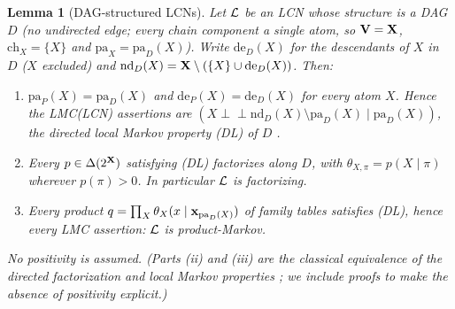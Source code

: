 \documentclass{article} %
\newtheorem{lemma}{Lemma}
\newcommand{\indep}{\perp\!\!\!\perp}
\newcommand{\ch}{\mathrm{ch}}
\newcommand{\pa}{\mathrm{pa}}
\begin{document}
\begin{lemma}[DAG-structured LCNs]\label{lem:dag}
Let $\mathcal{L}$ be an LCN whose structure is a DAG $D$ (no undirected edge; every chain
component a single atom, so $\mathbf{V}=\mathbf{X}$, $\ch_X=\{X\}$ and $\pa_X=\pa_D(X)$). Write
$\mathrm{de}_D(X)$ for the descendants of $X$ in $D$ ($X$ excluded) and
$\mathrm{nd}_D(X)=\mathbf{X}\setminus(\{X\}\cup\mathrm{de}_D(X))$. Then:
\begin{enumerate}
  \item[(i)] $\pa_P(X)=\pa_D(X)$ and $\mathrm{de}_P(X)=\mathrm{de}_D(X)$ for every atom
  $X$. Hence the LMC(LCN) assertions are
  $(X\indep\mathrm{nd}_D(X)\setminus\pa_D(X)\mid\pa_D(X))$, the \emph{directed
  local Markov property} (DL) of $D$ \citep{lauritzen96}.
  \item[(ii)] Every $p\in\Delta(2^{\mathbf{X}})$ satisfying (DL) factorizes along $D$, with
  $\theta_{X,\pi}=p(X\mid\pi)$ wherever $p(\pi)>0$. In particular $\mathcal{L}$ is
  factorizing.
  \item[(iii)] Every product $q=\prod_X\theta_X(x\mid\bx_{\pa_D(X)})$ of family
  tables satisfies (DL), hence every LMC assertion: $\mathcal{L}$ is product-Markov.
\end{enumerate}
No positivity is assumed. (Parts (ii) and (iii) are the classical equivalence of
the directed factorization and local Markov properties
\citep[Thm.~3.27]{lauritzen96}; we include proofs to make the absence of
positivity explicit.)
\end{lemma}
\end{document}
